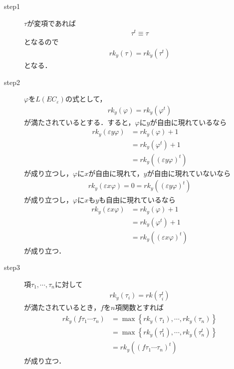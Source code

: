 	\begin{metaprf}\mbox{}
		\begin{description}
			\item[step1] 
				$\tau$が変項であれば
				\begin{align}
					\tau^{t} \equiv \tau
				\end{align}
				となるので
				\begin{align}
					rk_{y}(\tau) = rk_{y}(\tau^{t})
				\end{align}
				となる．
			
			\item[step2] $\varphi$を$L(EC_{\varepsilon})$の式として，
				\begin{align}
					rk_{y}(\varphi) = rk_{y}(\varphi^{t})
				\end{align}
				が満たされているとする．すると，$\varphi$に$y$が自由に現れているなら
				\begin{align}
					rk_{y}(\varepsilon y \varphi)
					&= rk_{y}(\varphi) + 1 \\
					&= rk_{y}(\varphi^{t}) + 1 \\
					&= rk_{y}((\varepsilon y \varphi)^{t})
				\end{align}
				が成り立つし，$\varphi$に$x$が自由に現れて，$y$が自由に現れていないなら
				\begin{align}
					rk_{y}(\varepsilon x \varphi) = 0 = rk_{y}((\varepsilon y \varphi)^{t})
				\end{align}
				が成り立つし，$\varphi$に$x$も$y$も自由に現れているなら
				\begin{align}
					rk_{y}(\varepsilon x \varphi)
					&= rk_{y}(\varphi) + 1 \\
					&= rk_{y}(\varphi^{t}) + 1 \\
					&= rk_{y}((\varepsilon x \varphi)^{t})
				\end{align}
				が成り立つ．
				
			\item[step3] 項$\tau_{1},\cdots,\tau_{n}$に対して
				\begin{align}
					rk_{y}(\tau_{i}) = rk(\tau_{i}^{t})
				\end{align}
				が満たされているとき，$f$を$n$項関数とすれば
				\begin{align}
					rk_{y}(f\tau_{1}\cdots\tau_{n})
					&= \max\left\{rk_{y}(\tau_{1}),\cdots,rk_{y}(\tau_{n})\right\} \\
					&= \max\left\{rk_{y}(\tau_{1}^{t}),\cdots,rk_{y}(\tau_{n}^{t})\right\} \\
					&= rk_{y}((f\tau_{1}\cdots\tau_{n})^{t})
				\end{align}
				が成り立つ．
				

\end{description}
\end{metaprf}
